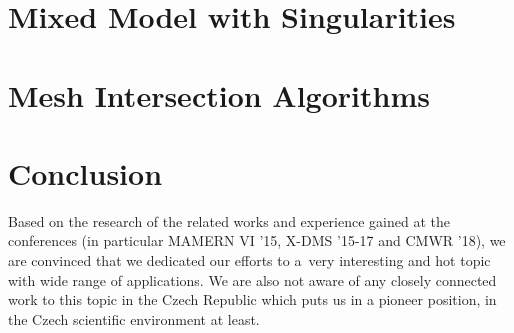 \documentclass[bibliography=totocnumbered,dvipsnames,FM,Dis, EN]{tulthesis_autoreferat}
\begin{document}

\chapter{Mixed Model with Singularities} \label{chap:xfem_mh}



% 

% 



\chapter{Mesh Intersection Algorithms} \label{chap:intersections}







\chapter{Conclusion} \label{chap:summary}


Based on the research of the related works and experience gained at the conferences
(in particular MAMERN VI '15, X-DMS '15-17 and CMWR '18),
we are convinced that we dedicated our efforts to a~very interesting and hot topic with wide range of applications.
We are also not aware of any closely connected work to this topic in the Czech Republic
which puts us in a pioneer position, in the Czech scientific environment at least.
\end{document}
